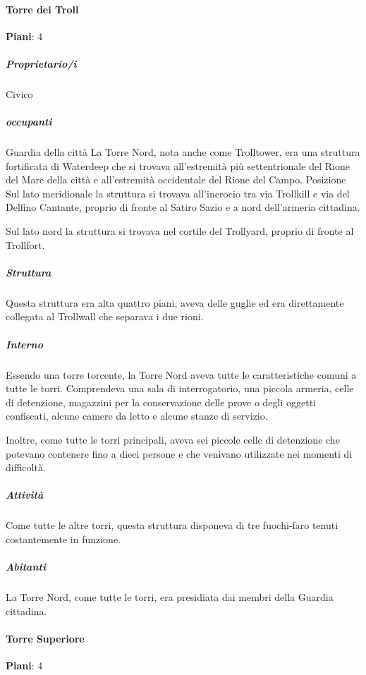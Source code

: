 \documentclass{article}
\begin{document}
                  \paragraph{Torre dei Troll}
                  \textbf{Piani}: 4\\
                      \subparagraph{Proprietario/i}
                      Civico
                      \subparagraph{occupanti}
                        Guardia della città
                        La Torre Nord, nota anche come Trolltower, era una struttura fortificata di Waterdeep che si trovava all'estremità più settentrionale del Rione del Mare della città e all'estremità occidentale del Rione del Campo.
                        Posizione
                        Sul lato meridionale la struttura si trovava all'incrocio tra via Trollkill e via del Delfino Cantante, proprio di fronte al Satiro Sazio e a nord dell'armeria cittadina.

                        Sul lato nord la struttura si trovava nel cortile del Trollyard, proprio di fronte al Trollfort.

                      \subparagraph{Struttura}
                        Questa struttura era alta quattro piani, aveva delle guglie ed era direttamente collegata al Trollwall che separava i due rioni.

                      \subparagraph{Interno}
                        Essendo una torre torcente, la Torre Nord aveva tutte le caratteristiche comuni a tutte le torri. Comprendeva una sala di interrogatorio, una piccola armeria, celle di detenzione, magazzini per la conservazione delle prove o degli oggetti confiscati, alcune camere da letto e alcune stanze di servizio.

                        Inoltre, come tutte le torri principali, aveva sei piccole celle di detenzione che potevano contenere fino a dieci persone e che venivano utilizzate nei momenti di difficoltà.

                      \subparagraph{Attività}
                        Come tutte le altre torri, questa struttura disponeva di tre fuochi-faro tenuti costantemente in funzione.

                      \subparagraph{Abitanti}
                        La Torre Nord, come tutte le torri, era presidiata dai membri della Guardia cittadina.


                  \paragraph{Torre Superiore}
                  \textbf{Piani}: 4\newline
\end{document}

